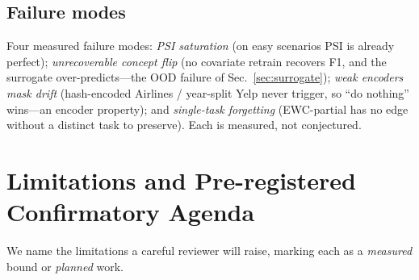 \documentclass[conference]{IEEEtran}
\begin{document}
\subsection{Failure modes}\label{sec:failures}
Four measured failure modes: \emph{PSI saturation} (on easy scenarios PSI is
already perfect); \emph{unrecoverable concept flip} (no covariate retrain
recovers F1, and the surrogate over-predicts---the OOD failure of
Sec.~\ref{sec:surrogate}); \emph{weak encoders mask drift} (hash-encoded
Airlines / year-split Yelp never trigger, so ``do nothing'' wins---an encoder
property); and \emph{single-task forgetting} (EWC-partial has no edge without
a distinct task to preserve). Each is measured, not conjectured.

\section{Limitations and Pre-registered Confirmatory Agenda}\label{sec:limits}
We name the limitations a careful reviewer will raise, marking each as a
\emph{measured} bound or \emph{planned} work.
\end{document}
